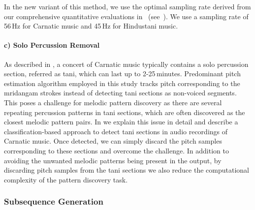 In the new variant of this method, we use the optimal sampling rate derived from our comprehensive quantitative evaluations in~\cite{gulati_ICASSP2015} (see~). We use a sampling rate of 56\,Hz for Carnatic music and 45\,Hz for Hindustani music.  



\paragraph{c) Solo Percussion Removal} 

As described in , a concert of Carnatic music typically contains a solo percussion section, referred as \gls{tani}, which can last up to 2-25\,minutes. Predominant pitch estimation algorithm employed in this study tracks pitch corresponding to the \gls{mridangam} strokes instead of detecting \gls{tani} sections as non-voiced segments. This poses a challenge for melodic pattern discovery as there are several repeating percussion patterns in \gls{tani} sections, which are often discovered as the closest melodic pattern pairs. In  we explain this issue in detail and describe a classification-based approach to detect \gls{tani} sections in audio recordings of Carnatic music. Once detected, we can simply discard the pitch samples corresponding to these sections and overcome the challenge. In addition to avoiding the unwanted melodic patterns being present in the output, by discarding pitch samples from the \gls{tani} sections we also reduce the computational complexity of the pattern discovery task.


\subsubsection{Subsequence Generation}
\label{sec:subsequencegeneration}

